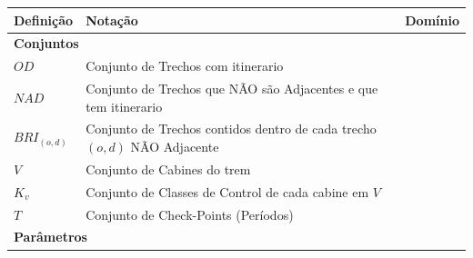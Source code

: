 \begin{table}[h]
	\centering
	\small
	\begin{tabular}{p{2cm} p{9.5cm} p{3.2cm}}
		\toprule
		\textbf{Definição} & \textbf{Notação}                                                                                                                                            & \textbf{Domínio}                             \\ \midrule
		\multicolumn{3}{l}{\textbf{Conjuntos}}                                                                                                                                                                                          \\ \midrule
		$OD$               & Conjunto de Trechos com itinerario                                                                                                                          &                                              \\
		$NAD$              & Conjunto de Trechos que NÃO são Adjacentes e que tem itinerario                                                                                             &                                              \\
		$BRI_{(o,d)}$      & Conjunto de Trechos contidos dentro de cada trecho $(o,d)$ NÃO Adjacente                                                                                    &                                              \\
		$V$                & Conjunto de Cabines do trem                                                                                                                                 &                                              \\
		$K_v$              & Conjunto de Classes de Control de cada cabine em $V$                                                                                                        &                                              \\
		$T$                & Conjunto de Check-Points (Períodos)                                                                                                                         &                                              \\ \midrule
		\multicolumn{3}{l}{\textbf{Parâmetros}}                                                                                                                                                                                         \\ \midrule

\end{tabular}
\end{table}
